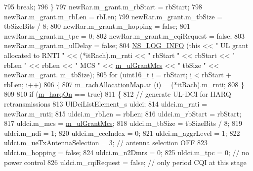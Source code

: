 \begin{DoxyCode}
795           \textcolor{keywordflow}{break};
796         \}
797       newRar.m\_grant.m\_rbStart = rbStart;
798       newRar.m\_grant.m\_rbLen = rbLen;
799       newRar.m\_grant.m\_tbSize = tbSizeBits / 8;
800       newRar.m\_grant.m\_hopping = \textcolor{keyword}{false};
801       newRar.m\_grant.m\_tpc = 0;
802       newRar.m\_grant.m\_cqiRequest = \textcolor{keyword}{false};
803       newRar.m\_grant.m\_ulDelay = \textcolor{keyword}{false};
804       \hyperlink{group__logging_gafbd73ee2cf9f26b319f49086d8e860fb}{NS\_LOG\_INFO} (\textcolor{keyword}{this} << \textcolor{stringliteral}{" UL grant allocated to RNTI "} << (*itRach).m\_rnti << \textcolor{stringliteral}{" rbStart "} << 
      rbStart << \textcolor{stringliteral}{" rbLen "} << rbLen << \textcolor{stringliteral}{" MCS "} << \hyperlink{classns3_1_1TdTbfqFfMacScheduler_a7382f05e10e61de33d6559202a1252bd}{m\_ulGrantMcs} << \textcolor{stringliteral}{" tbSize "} << newRar.m\_grant.
      m\_tbSize);
805       \textcolor{keywordflow}{for} (uint16\_t \hyperlink{bernuolliDistribution_8m_a6f6ccfcf58b31cb6412107d9d5281426}{i} = rbStart; \hyperlink{bernuolliDistribution_8m_a6f6ccfcf58b31cb6412107d9d5281426}{i} < rbStart + rbLen; \hyperlink{bernuolliDistribution_8m_a6f6ccfcf58b31cb6412107d9d5281426}{i}++)
806         \{
807           \hyperlink{classns3_1_1TdTbfqFfMacScheduler_a09760afce6c2b248fbc5cbcffb9dede5}{m\_rachAllocationMap}.at (\hyperlink{bernuolliDistribution_8m_a6f6ccfcf58b31cb6412107d9d5281426}{i}) = (*itRach).m\_rnti;
808         \}
809 
810       \textcolor{keywordflow}{if} (\hyperlink{classns3_1_1TdTbfqFfMacScheduler_afbd88f1e039b365dcdbb076e99ce5506}{m\_harqOn} == \textcolor{keyword}{true})
811         \{
812           \textcolor{comment}{// generate UL-DCI for HARQ retransmissions}
813           UlDciListElement\_s uldci;
814           uldci.m\_rnti = newRar.m\_rnti;
815           uldci.m\_rbLen = rbLen;
816           uldci.m\_rbStart = rbStart;
817           uldci.m\_mcs = \hyperlink{classns3_1_1TdTbfqFfMacScheduler_a7382f05e10e61de33d6559202a1252bd}{m\_ulGrantMcs};
818           uldci.m\_tbSize = tbSizeBits / 8;
819           uldci.m\_ndi = 1;
820           uldci.m\_cceIndex = 0;
821           uldci.m\_aggrLevel = 1;
822           uldci.m\_ueTxAntennaSelection = 3; \textcolor{comment}{// antenna selection OFF}
823           uldci.m\_hopping = \textcolor{keyword}{false};
824           uldci.m\_n2Dmrs = 0;
825           uldci.m\_tpc = 0; \textcolor{comment}{// no power control}
826           uldci.m\_cqiRequest = \textcolor{keyword}{false}; \textcolor{comment}{// only period CQI at this stage}

\end{DoxyCode}
